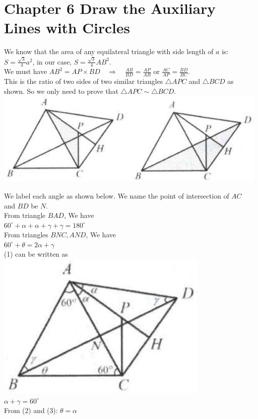 \documentclass[10pt]{article}
\begin{document}
\section*{Chapter 6 Draw the Auxiliary Lines with Circles}
We know that the area of any equilateral triangle with side length of \(a\) is: \(S=\frac{\sqrt{3}}{4} a^{2}\), in our case, \(S=\frac{\sqrt{3}}{4} A B^{2}\).\\
We must have \(A B^{2}=A P \times B D \quad \Rightarrow \quad \frac{A B}{B D}=\frac{A P}{A B}\) or \(\frac{A C}{A P}=\frac{B D}{B C}\).\\
This is the ratio of two sides of two similar triangles \(\triangle A P C\) and \(\triangle B C D\) as shown. So we only need to prove that \(\triangle A P C \sim \triangle B C D\).\\
\includegraphics[max width=\textwidth, center]{2025_04_17_97bc1f7e44d93c271a88g-201}

We label each angle as shown below. We name the point of intersection of \(A C\) and \(B D\) be \(N\).\\
From triangle \(B A D\), We have\\
\(60^{\circ}+\alpha+\alpha+\gamma+\gamma=180^{\circ}\)\\
From triangles \(B N C, A N D\), We have\\
\(60^{\circ}+\theta=2 \alpha+\gamma\)\\
(1) can be written as\\
\includegraphics[max width=\textwidth, center]{2025_04_17_97bc1f7e44d93c271a88g-201(1)}\\
\(\alpha+\gamma=60^{\circ}\)\\
From (2) and (3): \(\theta=\alpha\)
\end{document}

